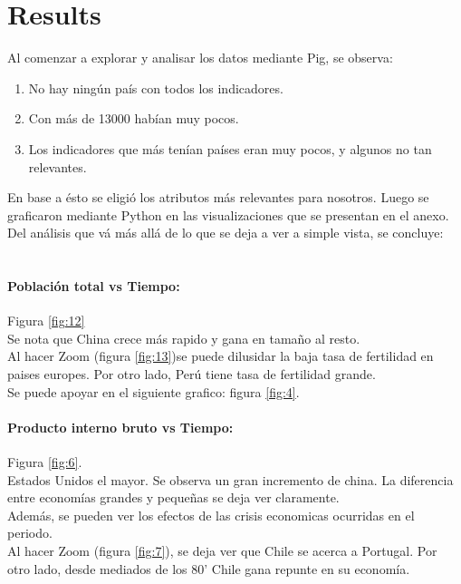 \documentclass{article}
\begin{document}
\section{Results}
Al comenzar a explorar y analisar los datos mediante Pig, se observa:
\begin{enumerate}
	\item No hay ningún país con todos los indicadores.
	\item Con más de 13000 habían muy pocos.
	\item Los indicadores que más tenían países eran muy pocos, y algunos no tan relevantes.
\end{enumerate}
En base a ésto se eligió los atributos más relevantes para nosotros. Luego se graficaron mediante Python en las visualizaciones que se presentan en el anexo.\\

Del análisis que vá más allá de lo que se deja a ver a simple vista, se concluye:\\
\\
\paragraph{Población total vs Tiempo:}
Figura \ref{fig:12}\\
Se nota que China crece más rapido y gana en tamaño al resto.\\

Al hacer Zoom (figura \ref{fig:13})se puede dilusidar la baja tasa de fertilidad en paises europes. Por otro lado, Perú tiene tasa de fertilidad grande. \\
Se puede apoyar en el siguiente grafico: figura \ref{fig:4}.

\paragraph{Producto interno bruto vs Tiempo:}
Figura \ref{fig:6}.\\
Estados Unidos el mayor. Se observa un gran incremento de china.
La diferencia entre economías grandes y pequeñas se deja ver claramente.\\

Además, se pueden ver los efectos de las crisis economicas ocurridas en el periodo.\\

Al hacer Zoom (figura \ref{fig:7}), se deja ver que Chile se acerca a Portugal. Por otro lado, desde mediados de los 80' Chile gana repunte en su economía.
\end{document}
